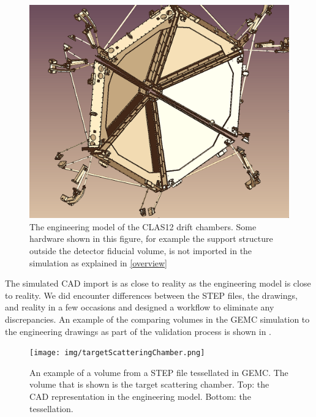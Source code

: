 \begin{figure}[h]
	\centering
	\includegraphics[width=1.0\columnwidth,keepaspectratio]{img/cadSelection.png}
	\caption{The engineering model of the CLAS12 drift chambers.
             Some hardware shown in this figure, for example the support structure outside the detector
             fiducial volume, is not imported in the simulation as explained in \ref{overview} }
	\label{fig:cadSelection}
\end{figure}

The simulated CAD import is as close to reality as the engineering model is close to reality.
We did encounter differences between the STEP files, the drawings, and reality in a few occasions and designed
a workflow to eliminate any discrepancies.
An example of the comparing volumes in the GEMC simulation to the engineering drawings
as part of the validation process is shown in .

\begin{figure}
	\centering
	\texttt{[image: img/targetScatteringChamber.png]}
	\caption{An example of a volume from a STEP file tessellated in GEMC. The volume that is shown is the target scattering chamber.
            Top: the CAD representation in the engineering model. Bottom: the tessellation. }
	\label{fig:targetScatteringChamber}
\end{figure}




